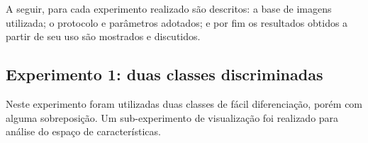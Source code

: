 A seguir, para cada experimento realizado são descritos: a base de imagens utilizada; o protocolo e parâmetros adotados; e por fim os resultados obtidos a partir de seu uso são mostrados e discutidos.

\FloatBarrier
\subsection{Experimento 1: duas classes discriminadas}

Neste experimento foram utilizadas duas classes de fácil diferenciação, porém com alguma sobreposição. Um sub-experimento de visualização foi realizado para análise do espaço de características.

